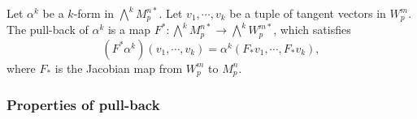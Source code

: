 \documentclass[11pt, a4paper]{book}
\begin{document}
\begin{Definition}
  \label{def:pullback-k-form}
  Let $\alpha^k$ be a $k$-form in $\bigwedge^k M_p^{n*}$. Let $v_1,\cdots,v_k$ be a tuple
  of tangent vectors in $W_p^m$. The pull-back of $\alpha^k$ is a map
  $F^{*}: \bigwedge^k M_p^{n*} \rightarrow \bigwedge^k W_p^{m*}$, which satisfies
  \begin{equation}
    \label{eq:pullback-k-form}
    \left( F^{*}\alpha^k \right)(v_1,\cdots,v_k) = \alpha^k(F_{*}v_1,\cdots,F_{*}v_k),
  \end{equation}
  where $F_{*}$ is the Jacobian map from $W_p^m$ to $M_p^n$.
\end{Definition}

\subsubsection{Properties of pull-back}
\end{document}
